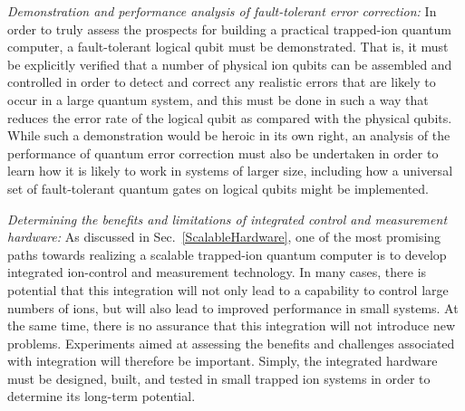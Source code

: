 \documentclass[%
12pt,
 amsmath,amssymb,
]{revtex4-2}
\begin{document}
\textit{Demonstration and performance analysis of fault-tolerant error correction:}  In order to truly assess the prospects for building a practical trapped-ion quantum computer, a fault-tolerant logical qubit must be demonstrated.  That is, it must be explicitly verified that a number of physical ion qubits can be assembled and controlled in order to detect and correct any realistic errors that are likely to occur in a large quantum system, and this must be done in such a way that reduces the error rate of the logical qubit as compared with the physical qubits.  While such a demonstration would be heroic in its own right, an analysis of the performance of quantum error correction must also be undertaken in order to learn how it is likely to work in systems of larger size, including how a universal set of fault-tolerant quantum gates on logical qubits might be implemented.

\textit{Determining the benefits and limitations of integrated control and measurement hardware:}  As discussed in Sec.~\ref{ScalableHardware}, one of the most promising paths towards realizing a scalable trapped-ion quantum computer is to develop integrated ion-control and measurement technology.  In many cases, there is potential that this integration will not only lead to a capability to control large numbers of ions, but will also lead to improved performance in small systems.  At the same time, there is no assurance that this integration will not introduce new problems.  Experiments aimed at assessing the benefits and challenges associated with integration will therefore be important.  Simply, the integrated hardware must be designed, built, and tested in small trapped ion systems in order to determine its long-term potential.
\end{document}
